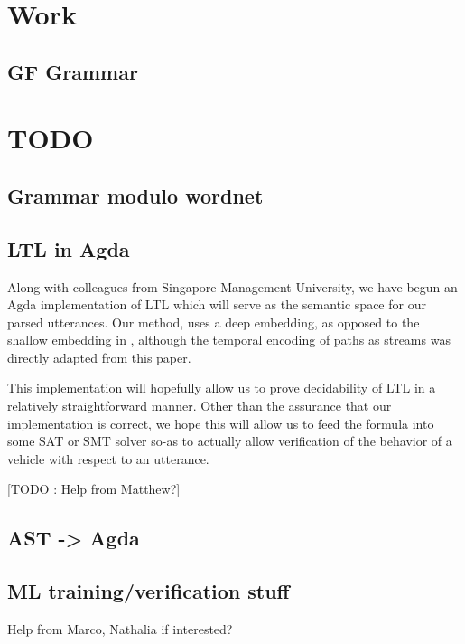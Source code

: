 \documentclass[a4paper, 11pt]{article}
\begin{document}
\section{Work} 

\subsection{GF Grammar}

\section{TODO} 

\subsection{Grammar modulo wordnet}

\subsection{LTL in Agda}

Along with colleagues from Singapore Management University, we have begun an
Agda implementation \cite{wltl} of LTL which will serve as the semantic space
for our parsed utterances. Our method, uses a deep embedding, as opposed to the
shallow embedding in \cite{coqLTL}, although the temporal encoding of paths as
streams was directly adapted from this paper.

This implementation will hopefully allow us to prove decidability of LTL in a
relatively straightforward manner. Other than the assurance that our
implementation is correct, we hope this will allow us to feed the formula into
some SAT or SMT solver so-as to actually allow verification of the behavior of a
vehicle with respect to an utterance.

[TODO : Help from Matthew?]

\subsection{AST -> Agda}

\subsection{ML training/verification stuff}
Help from Marco, Nathalia if interested?


\printbibliography
\end{document}
